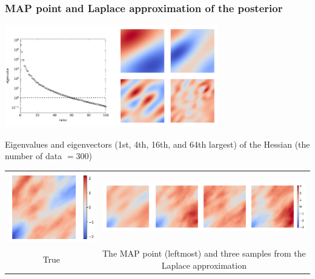 \documentclass{beamer}
\begin{document}
\begin{frame}[c]
  \frametitle{MAP point and Laplace approximation of the posterior}

  \begin{center}
    \includegraphics[width=0.7\textwidth]{./figures/ex1_misfit_eig.pdf}

    {\tiny Eigenvalues and eigenvectors (1st, 4th, 16th, and 64th largest) of the
    Hessian (the number of data $= 300$)}
  \end{center}

  \begin{tabulary}{\linewidth}{CC}
    \includegraphics[height=0.24\textheight]{./figures/ex1_true_parameter.png}
    &
    \includegraphics[height=0.24\textheight]{./figures/ex1_la_samples.pdf}
    \\
    {\tiny True}
    &
    {\tiny The MAP point (leftmost) and three samples from the Laplace
    approximation}
  \end{tabulary}


\end{frame}
\end{document}
